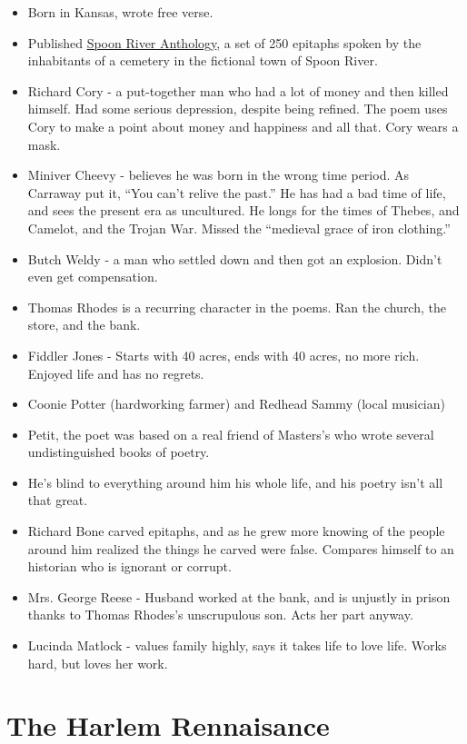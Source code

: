 \documentclass[10pt]{article}
\begin{document}
\begin{itemize}
	\item Born in Kansas, wrote free verse.
	\item Published \underline{Spoon River Anthology}, a
		set of 250 epitaphs spoken by the inhabitants of 
		a cemetery in the fictional town of Spoon River.
	\item Richard Cory - a put-together man who had
		a lot of money and then killed himself.  Had some
		serious depression, despite being refined.
		The poem uses Cory to make a point about money
		and happiness and all that.  Cory wears a mask.
	\item Miniver Cheevy - believes he was born in the
		wrong time period.  As Carraway put it, ``You can't
		relive the past.''  He has had a bad time of life,
		and sees the present era as uncultured.  He longs
		for the times of Thebes, and Camelot, and the
		Trojan War.  Missed the ``medieval grace of iron
		clothing.''
	\item Butch Weldy - a man who settled down and then
		got an explosion.  Didn't even get compensation.
	\item Thomas Rhodes is a recurring character in 
		the poems.  Ran the church, the store, and the
		bank.
	\item Fiddler Jones - Starts with 40 acres, ends
		with 40 acres, no more rich.  Enjoyed life and
		has no regrets.
	\item Coonie Potter (hardworking farmer) and 
		Redhead Sammy (local musician)
	\item Petit, the poet was based on a real friend
		of Masters's who wrote several undistinguished
		books of poetry.
	\item He's blind to everything around him his whole
		life, and his poetry isn't all that great.
	\item Richard Bone carved epitaphs, and as he grew
		more knowing of the people around him realized the
		things he carved were false.  Compares himself
		to an historian who is ignorant or corrupt.
	\item Mrs. George Reese - Husband worked at the 
		bank, and is unjustly in prison thanks to Thomas
		Rhodes's unscrupulous son.  Acts her part anyway.
	\item Lucinda Matlock - values family highly, says
		it takes life to love life.  Works hard, but 
		loves her work.  
\end{itemize}

\section{The Harlem Rennaisance}
\end{document}
